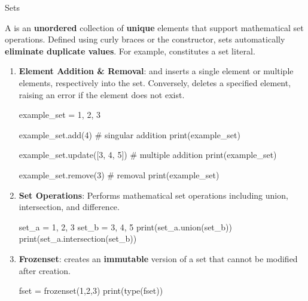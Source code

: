 \documentclass[10pt]{article}
\begin{document}
    \begin{core}{Sets}

      A  is an \textbf{unordered} collection of \textbf{unique} elements that support mathematical set operations. Defined using curly braces or the  constructor, sets automatically \textbf{eliminate duplicate values}. For example,  constitutes a set literal.

      \begin{enumerate}

        \item \textbf{Element Addition \& Removal}:  and  inserts a single element or multiple elements, respectively into the set. Conversely,  deletes a specified element, raising an error if the element does not exist.

        \begin{pyconsole}

          example_set = {1, 2, 3}

          example_set.add(4) # singular addition
          print(example_set)

          example_set.update([3, 4, 5]) # multiple addition
          print(example_set)

          example_set.remove(3) # removal
          print(example_set)

        \end{pyconsole}

        \item \textbf{Set Operations}: Performs mathematical set operations including union, intersection, and difference.

        \begin{pyconsole}

          set_a = {1, 2, 3}
          set_b = {3, 4, 5}
          print(set_a.union(set_b))
          print(set_a.intersection(set_b))

        \end{pyconsole}

        \item \textbf{Frozenset}:  creates an \textbf{immutable} version of a set that cannot be modified after creation.

        \begin{pyconsole}

          fset = frozenset({1,2,3})
          print(type(fset))

        \end{pyconsole}

      \end{enumerate}

    \end{core}
\end{document}
